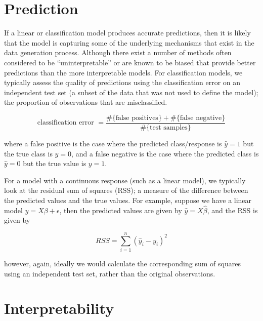 \section{Prediction}


If a linear or classification model produces accurate predictions, then it is likely that the model is capturing some of the underlying mechanisms that exist in the data generation process. Although there exist a number of methods often considered to be ``uninterpretable'' or are known to be biased that provide better predictions than the more interpretable models. For classification models, we typically assess the quality of predictions using the classification error on an independent test set (a subset of the data that was not used to define the model); the proportion of observations that are misclassified.

$$\text{classification error } = \frac{\#\{\text{false positives}\} + \#\{\text{false negative}\}}{\#\{\text{test samples}\}}$$

where a false positive is the case where the predicted class/response is $\hat{y} = 1$ but the true class is $y = 0$, and a false negative is the case where the predicted class is $\hat{y} = 0$ but the true value is $y = 1$.

For a model with a continuous response (such as a linear model), we typically look at the residual sum of squares (RSS); a measure of the difference between the predicted values and the true values. For example, suppose we have a linear model $y =  X\beta + \epsilon$, then the predicted values are given by $\hat{y} = X \hat{\beta}$, and the RSS is given by

$$RSS = \sum_{i=1}^n (\hat{y}_i - y_i)^2$$

however, again, ideally we would calculate the corresponding sum of squares using an independent test set, rather than the original observations.



\section{Interpretability}

